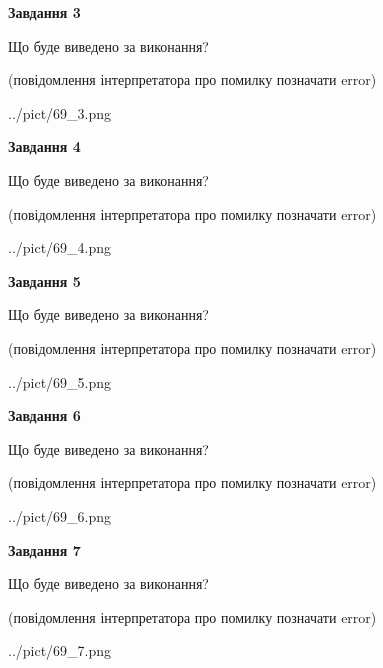 \documentclass[12pt, ukrainian]{article}
\begin{document}
{\begin {large}
{\begin {center}\textbf{Завдання 3}\end {center}}\par
Що буде виведено за виконання?\par
 (повідомлення інтерпретатора про помилку позначати error)\par
\begin{center}
	{../pict/69_3.png}
\end{center}
\newpage

{\begin {center}\textbf{Завдання 4}\end {center}}\par
Що буде виведено за виконання?\par
 (повідомлення інтерпретатора про помилку позначати error)\par
\begin{center}
	{../pict/69_4.png}
\end{center}
\newpage

{\begin {center}\textbf{Завдання 5}\end {center}}\par
Що буде виведено за виконання?\par
 (повідомлення інтерпретатора про помилку позначати error)\par
\begin{center}
	{../pict/69_5.png}
\end{center}
\newpage

{\begin {center}\textbf{Завдання 6}\end {center}}\par
Що буде виведено за виконання?\par
 (повідомлення інтерпретатора про помилку позначати error)\par
\begin{center}
	{../pict/69_6.png}
\end{center}
\newpage

{\begin {center}\textbf{Завдання 7}\end {center}}\par
Що буде виведено за виконання?\par
 (повідомлення інтерпретатора про помилку позначати error)\par
\begin{center}
	{../pict/69_7.png}
\end{center}
\newpage


\end{large}}
\end{document}
